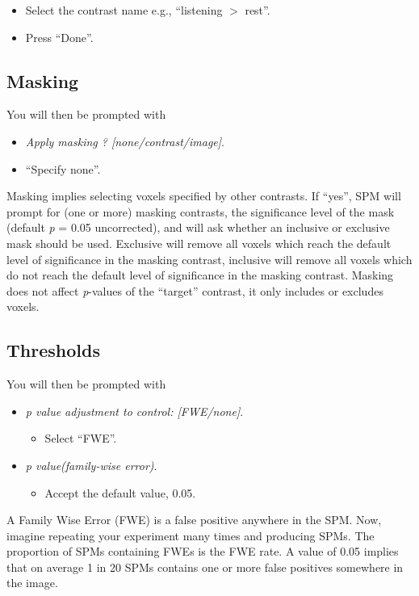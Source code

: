 \begin{itemize}
\item Select the contrast name e.g., ``listening $>$ rest''.
\item Press ``Done''.
\end{itemize}

\subsection{Masking}

You will then be prompted with

\begin{itemize}
\item  \emph{Apply masking ? [none/contrast/image]}.
\item ``Specify none''.
\end{itemize}

Masking implies selecting voxels specified by other contrasts. If ``yes'', SPM will prompt for (one or more) masking contrasts, the significance level of the mask (default \textit{p} = 0.05 uncorrected), and will ask whether an inclusive or exclusive mask should be used. Exclusive will remove all voxels which reach the default level of significance in the masking contrast, inclusive will remove all voxels which do not reach the default level of significance in the masking contrast. Masking does not affect \textit{p}-values of the ``target'' contrast, it only includes or excludes voxels.

\subsection{Thresholds}

You will then be prompted with

\begin{itemize}
\item \emph{p value adjustment to control: [FWE/none]}.
\begin{itemize}
\item Select ``FWE''.
\end{itemize}
\item \emph{p value(family-wise error)}.
\begin{itemize}
\item Accept the default value, 0.05.
\end{itemize}
\end{itemize}

A Family Wise Error (FWE) is a false positive anywhere in the SPM. Now, imagine repeating your experiment many times and producing SPMs. The proportion of SPMs containing FWEs is the FWE rate. A value of 0.05 implies that on average 1 in 20 SPMs contains one or more false positives somewhere in the image. 

